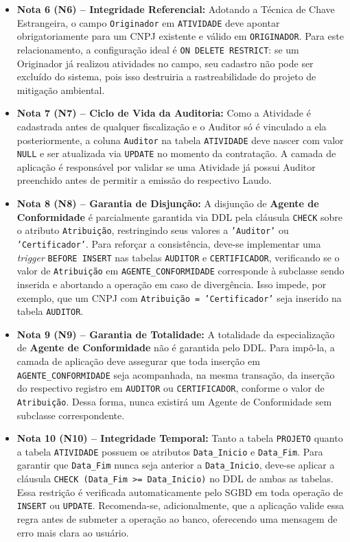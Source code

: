 \documentclass[12pt]{article}
\begin{document}
\begin{itemize}
    \item \textbf{Nota 6 (N6) -- Integridade Referencial:}
    Adotando a Técnica de Chave Estrangeira, o campo \texttt{Originador} em \texttt{ATIVIDADE} deve apontar obrigatoriamente para um CNPJ existente e válido em \texttt{ORIGINADOR}. Para este relacionamento, a configuração ideal é \texttt{ON DELETE RESTRICT}: se um Originador já realizou atividades no campo, seu cadastro não pode ser excluído do sistema, pois isso destruiria a rastreabilidade do projeto de mitigação ambiental.
 
    \item \textbf{Nota 7 (N7) -- Ciclo de Vida da Auditoria:}
    Como a Atividade é cadastrada antes de qualquer fiscalização e o Auditor só é vinculado a ela posteriormente, a coluna \texttt{Auditor} na tabela \texttt{ATIVIDADE} deve nascer com valor \texttt{NULL} e ser atualizada via \texttt{UPDATE} no momento da contratação. A camada de aplicação é responsável por validar se uma Atividade já possui Auditor preenchido antes de permitir a emissão do respectivo Laudo.
 
    \item \textbf{Nota 8 (N8) -- Garantia de Disjunção:}
    A disjunção de \textbf{Agente de Conformidade} é parcialmente garantida via DDL pela cláusula \texttt{CHECK} sobre o atributo \texttt{Atribuição}, restringindo seus valores a \texttt{'Auditor'} ou \texttt{'Certificador'}. Para reforçar a consistência, deve-se implementar uma \textit{trigger} \texttt{BEFORE INSERT} nas tabelas \texttt{AUDITOR} e \texttt{CERTIFICADOR}, verificando se o valor de \texttt{Atribuição} em \texttt{AGENTE\_CONFORMIDADE} corresponde à subclasse sendo inserida e abortando a operação em caso de divergência. Isso impede, por exemplo, que um CNPJ com \texttt{Atribuição = 'Certificador'} seja inserido na tabela \texttt{AUDITOR}.
 
    \item \textbf{Nota 9 (N9) -- Garantia de Totalidade:}
    A totalidade da especialização de \textbf{Agente de Conformidade} não é garantida pelo DDL. Para impô-la, a camada de aplicação deve assegurar que toda inserção em \texttt{AGENTE\_CONFORMIDADE} seja acompanhada, na mesma transação, da inserção do respectivo registro em \texttt{AUDITOR} ou \texttt{CERTIFICADOR}, conforme o valor de \texttt{Atribuição}. Dessa forma, nunca existirá um Agente de Conformidade sem subclasse correspondente.
 
    \item \textbf{Nota 10 (N10) -- Integridade Temporal:}
    Tanto a tabela \texttt{PROJETO} quanto a tabela \texttt{ATIVIDADE} possuem os atributos \texttt{Data\_Inicio} e \texttt{Data\_Fim}. Para garantir que \texttt{Data\_Fim} nunca seja anterior a \texttt{Data\_Inicio}, deve-se aplicar a cláusula \texttt{CHECK (Data\_Fim >= Data\_Inicio)} no DDL de ambas as tabelas. Essa restrição é verificada automaticamente pelo SGBD em toda operação de \texttt{INSERT} ou \texttt{UPDATE}. Recomenda-se, adicionalmente, que a aplicação valide essa regra antes de submeter a operação ao banco, oferecendo uma mensagem de erro mais clara ao usuário.
 

\end{itemize}
\end{document}
